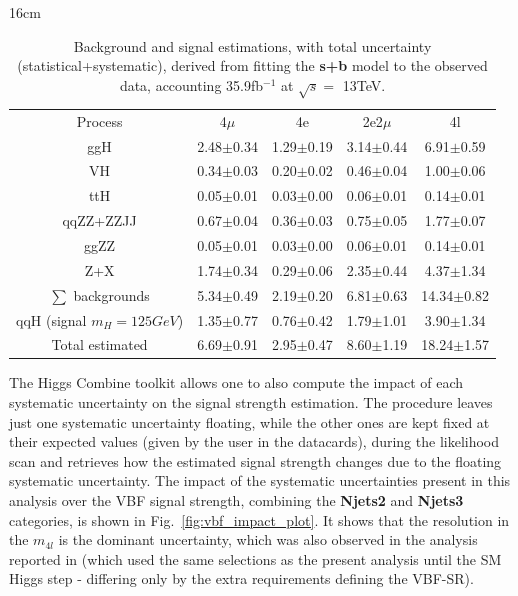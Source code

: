 \begin{table}[hbtp]{16cm}
	\caption{Background and signal estimations, with total uncertainty (statistical+systematic), derived from fitting the \textbf{s+b} model to the observed data, accounting 35.9fb$^{-1}$ at $\sqrt{s}=$ 13TeV.}
	\centering
	\begin{tabular}{c|c|c|c|c}
		\hline
		\rowcolor{light_gray}
		Process                     & 4$\mu$        & 4e            & 2e2$\mu$      & 4l\\
		ggH                         & 2.48$\pm$0.34 & 1.29$\pm$0.19 & 3.14$\pm$0.44 & 6.91$\pm$0.59\\
		VH                          & 0.34$\pm$0.03 & 0.20$\pm$0.02 & 0.46$\pm$0.04 & 1.00$\pm$0.06\\
		ttH                         & 0.05$\pm$0.01 & 0.03$\pm$0.00 & 0.06$\pm$0.01 & 0.14$\pm$0.01\\
		qqZZ+ZZJJ                   & 0.67$\pm$0.04 & 0.36$\pm$0.03 & 0.75$\pm$0.05 & 1.77$\pm$0.07\\
		ggZZ                        & 0.05$\pm$0.01 & 0.03$\pm$0.00 & 0.06$\pm$0.01 & 0.14$\pm$0.01\\
		Z+X                         & 1.74$\pm$0.34 & 0.29$\pm$0.06 & 2.35$\pm$0.44 & 4.37$\pm$1.34\\
		\hline
		$\sum$ backgrounds          & 5.34$\pm$0.49 & 2.19$\pm$0.20 & 6.81$\pm$0.63 & 14.34$\pm$0.82\\
		\hline
		qqH (signal $m_{H}=125GeV$) & 1.35$\pm$0.77 & 0.76$\pm$0.42 & 1.79$\pm$1.01 &  3.90$\pm$1.34\\
		\hline
		Total estimated              & 6.69$\pm$0.91 & 2.95$\pm$0.47 & 8.60$\pm$1.19 & 18.24$\pm$1.57\\
		\hline
	\end{tabular}
	\label{tab:yields_uncertainties_postfit}
\end{table}

The Higgs Combine toolkit allows one to also compute the impact of each systematic uncertainty on the signal strength estimation. The procedure leaves just one systematic uncertainty floating, while the other ones are kept fixed at their expected values (given by the user in the datacards), during the likelihood scan and retrieves how the estimated signal strength changes due to the floating systematic uncertainty. The impact of the systematic uncertainties present in this analysis over the VBF signal strength, combining the \textbf{Njets2} and \textbf{Njets3} categories, is shown in Fig.~\ref{fig:vbf_impact_plot}. It shows that the resolution in the $m_{4l}$ is the dominant uncertainty, which was also observed in the analysis reported in \cite{bib:CMS-AN-16-328} (which used the same selections as the present analysis until the SM Higgs step - differing only by the extra requirements defining the VBF-SR).

